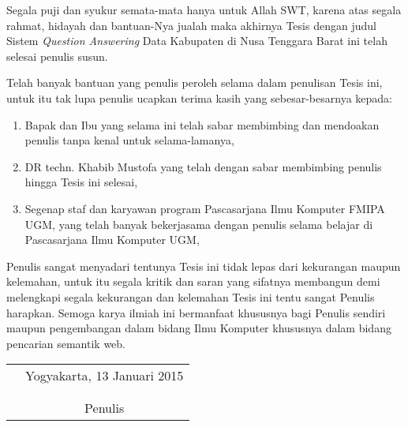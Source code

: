 \documentclass[tesis]{ugmtesis}
\begin{document}
\preface
Segala puji dan syukur semata-mata hanya untuk Allah SWT, karena atas segala
rahmat, hidayah dan bantuan-Nya jualah maka akhirnya Tesis dengan judul
Sistem \textit{Question Answering} Data Kabupaten di Nusa Tenggara Barat ini telah selesai penulis susun.

Telah banyak bantuan yang penulis peroleh selama dalam penulisan Tesis ini, untuk itu tak lupa penulis ucapkan terima kasih yang sebesar-besarnya kepada:

\begin{enumerate}
	\item{Bapak dan Ibu yang selama ini telah sabar membimbing dan mendoakan penulis tanpa kenal untuk selama-lamanya,}
	\item{DR techn. Khabib Mustofa yang telah dengan sabar membimbing penulis hingga Tesis ini selesai,}
	\item{Segenap staf dan karyawan program Pascasarjana Ilmu Komputer FMIPA UGM, yang telah banyak bekerjasama dengan penulis selama belajar di Pascasarjana Ilmu Komputer UGM,}
\end{enumerate}

Penulis sangat menyadari tentunya Tesis ini tidak lepas dari kekurangan maupun kelemahan, untuk itu segala kritik dan saran yang sifatnya membangun demi melengkapi segala kekurangan dan kelemahan Tesis ini tentu sangat Penulis harapkan. Semoga karya ilmiah ini bermanfaat khususnya bagi Penulis sendiri maupun pengembangan dalam bidang Ilmu Komputer khususnya 
dalam bidang pencarian semantik web.

\begin{tabular}{p{7.5cm}c}
&Yogyakarta, 13 Januari 2015\\
&\\
&\\
&Penulis
\end{tabular}

\tableofcontents
\listoftables
\listoffigures


\end{document}
